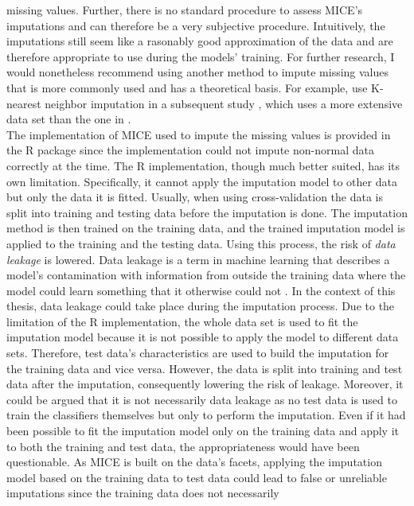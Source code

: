 missing values. Further, there is no standard procedure to assess MICE's 
imputations and can therefore be a very subjective procedure. Intuitively, 
the imputations still seem like a rasonably good approximation of the data and 
are therefore appropriate to use during the models' training.
For further research, I would nonetheless recommend using another method to 
impute missing values that is more commonly used and has a theoretical basis. 
For example, \citeauthor{RN127} use K-nearest neighbor imputation in a 
subsequent study \cite{RN179}, which uses a more extensive data set than the 
one in \cite{RN127}.
\\
The implementation of MICE used to impute the missing values is provided in the 
R package  since the  implementation could not 
impute non-normal data correctly at the time. The R implementation, 
though much better suited, has its own limitation. Specifically, it cannot 
apply the imputation model to other data but only the data it is fitted. 
Usually, when using cross-validation the data is split into 
training and testing data before the imputation is done. The imputation method 
is then trained on the training data, and the trained imputation model is 
applied to the training and the testing data. Using this process, the 
risk of \textit{data leakage} is lowered.
Data leakage is a term in machine learning 
that describes a model's contamination with information from outside the 
training data where the model could learn something that it otherwise could not 
\cite{RN199}.
In the context of this thesis, data leakage could take place during the 
imputation process. Due to the limitation of the R implementation, the whole 
data set is used to fit the imputation model because it is not possible to 
apply the model to different data sets. Therefore, test data's characteristics 
are used to build the imputation for the training data and vice 
versa. However, the data is split into training and test data after the 
imputation, consequently lowering the risk of leakage. Moreover, it could be 
argued that it is not necessarily data leakage as no test data is used to train 
the classifiers themselves but only to perform the imputation.
Even if it had been possible to fit the imputation model only on the training 
data and apply it to both the training and test data, the appropriateness would 
have been questionable. As MICE is built on the data's facets, applying 
the imputation model based on the training data to test data could lead to 
false or unreliable imputations since the training data does not necessarily 
